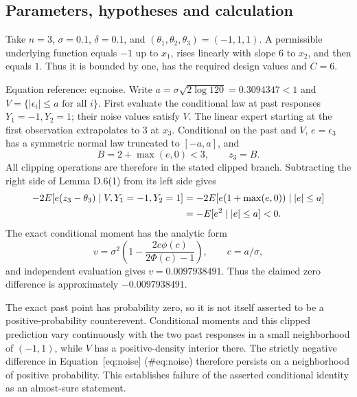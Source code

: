 \documentclass[10pt]{article}
\begin{document}
\subsection*{Parameters, hypotheses and calculation}
Take \(n=3\), \(\sigma=0.1\), \(\delta=0.1\), and \((\theta_1,\theta_2,\theta_3)=(-1,1,1)\). A permissible underlying function equals \(-1\) up to \(x_1\), rises linearly with slope \(6\) to \(x_2\), and then equals \(1\). Thus it is bounded by one, has the required design values and \(C=6\).\par
Equation reference: eq:noise. Write \(a=\sigma\sqrt{2\log120}=0.3094347<1\) and \(V=\{|\epsilon_i|\le a\text{ for all }i\}\). First evaluate the conditional law at past responses \(Y_1=-1,Y_2=1\); their noise values satisfy \(V\). The linear expert starting at the first observation extrapolates to \(3\) at \(x_3\). Conditional on the past and \(V\), \(e=\epsilon_3\) has a symmetric normal law truncated to \([-a,a]\), and \[B=2+\max(e,0)<3,\qquad z_3=B.\] All clipping operations are therefore in the stated clipped branch. Subtracting the right side of Lemma D.6(1) from its left side gives \[\begin{aligned}
 -2E[e(z_3-\theta_3)\mid V,Y_1=-1,Y_2=1]
 &=-2E[e(1+\max(e,0))\mid |e|\le a]\notag\\
 &=-E[e^2\mid |e|\le a]<0. \end{aligned}\] The exact conditional moment has the analytic form \[v=\sigma^2\left(1-\frac{2c\phi(c)}{2\Phi(c)-1}\right),
 \qquad c=a/\sigma,\] and independent evaluation gives \(v=0.0097938491\). Thus the claimed zero difference is approximately \(-0.0097938491\).\par
The exact past point has probability zero, so it is not itself asserted to be a positive-probability counterevent. Conditional moments and this clipped prediction vary continuously with the two past responses in a small neighborhood of \((-1,1)\), while \(V\) has a positive-density interior there. The strictly negative difference in Equation [eq:noise] (\#eq:noise) therefore persists on a neighborhood of positive probability. This establishes failure of the asserted conditional identity as an almost-sure statement.\par
\end{document}
